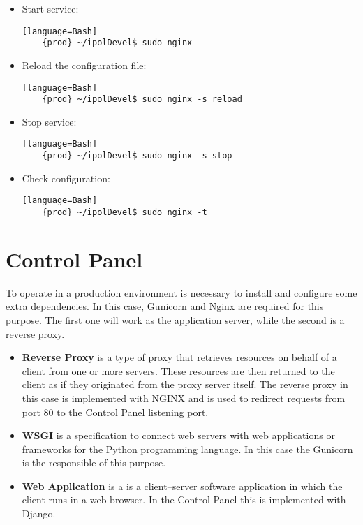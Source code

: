 \documentclass[a4paper,12pt]{article}
\begin{document}
\begin{itemize}
    \item Start service:
    \begin{verbatim}[language=Bash]
    {prod} ~/ipolDevel$ sudo nginx
    \end{verbatim}
    \item Reload the configuration file:
    \begin{verbatim}[language=Bash]
    {prod} ~/ipolDevel$ sudo nginx -s reload
    \end{verbatim}
    \item Stop service:
    \begin{verbatim}[language=Bash]
    {prod} ~/ipolDevel$ sudo nginx -s stop
    \end{verbatim}
    \item Check configuration:
    \begin{verbatim}[language=Bash]
    {prod} ~/ipolDevel$ sudo nginx -t
    \end{verbatim}
\end{itemize}


\section{Control Panel}
To operate in a production environment is necessary to install and configure some extra dependencies. In this case, Gunicorn and Nginx are
required for this purpose. The first one will work as the application server, while the second is a reverse proxy.

\begin{itemize}
    \item \textbf{Reverse Proxy} is a type of proxy that retrieves resources on behalf of a client from one or more servers.
    These resources are then returned to the client as if they originated from the proxy server itself. The reverse proxy in this case is
    implemented with NGINX and is used to redirect requests from port 80 to the Control Panel listening port.
    \item \textbf{WSGI} is a specification to connect web servers with web applications or frameworks for the Python programming language.
    In this case the Gunicorn is the responsible of this purpose.
    \item \textbf{Web Application} is a is a client–server software application in which the client runs in a web browser. In the Control Panel this
    is implemented with Django.
\end{itemize}
\end{document}
